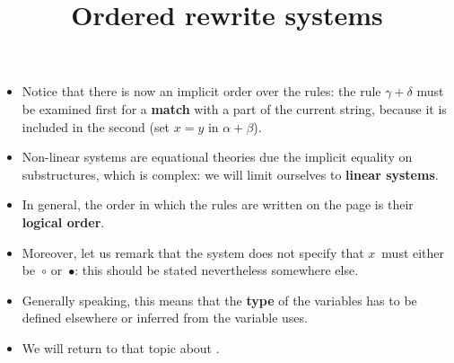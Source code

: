 \documentclass[wide]{slides}
\begin{document}
\begin{slide}
  \title{Ordered rewrite systems}

  \begin{itemize}

    \item Notice that there is now an implicit order over the rules:
      the rule \(\gamma+\delta\) must be examined first for a
      \textbf{match} with a part of the current string, because it is
      included in the second (set \(x=y\) in \(\alpha+\beta\)).

    \item Non\hyp{}linear systems are equational theories due the
      implicit equality on substructures, which is complex: we will
      limit ourselves to \textbf{linear systems}.

    \item In general, the order in which the rules are written on the
      page is their \textbf{logical order}.

    \item Moreover, let us remark that the system does not specify
      that \(x\)~must either be~\(\circ\) or~\(\bullet\): this should
      be stated nevertheless somewhere else.

    \item Generally speaking, this means that the \textbf{type} of the
      variables has to be defined elsewhere or inferred from the
      variable uses.

      \item We will return to that topic about \OCaml.

  \end{itemize}
\end{slide}
\end{document}
